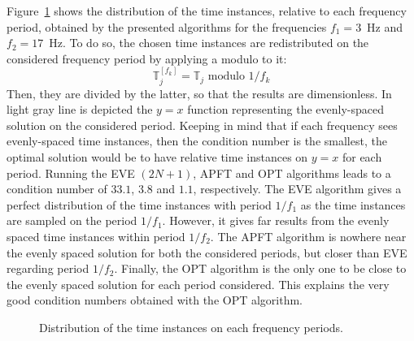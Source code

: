 Figure~\ref{fig:distribution_tlv} shows the distribution of the time
instances, relative to each frequency period, obtained by the presented
algorithms for the frequencies $f_1 = 3$~Hz and $f_2 = 17$~Hz. 
To do so, the chosen time instances are redistributed
on the considered frequency period by applying a modulo to it:
\begin{equation}
  \label{eq:1}
  \mathbb{T}^{[f_k]}_j =  \mathbb{T}_j \text{ modulo } 1/f_k
\end{equation}
Then, they are divided by the latter, so that the results are
dimensionless.  In light gray line is depicted the $y=x$ function
representing the evenly-spaced solution on the considered period.
Keeping in mind that if each frequency sees evenly-spaced time instances,
then the condition number is the smallest, the optimal solution would
be to have relative time instances on $y=x$ for each period.  Running the
EVE $(2N + 1)$, APFT and OPT algorithms leads to a condition number of $33.1$,
$3.8$ and $1.1$, respectively.  The EVE algorithm gives a perfect distribution
of the time instances with
period $1/f_1$ as the time instances are sampled on the period
$1/f_1$. However, it gives far results from the evenly spaced time instances
within period $1/f_2$. The APFT algorithm is nowhere near the evenly spaced
solution for both the considered periods, but closer than EVE regarding
period $1/f_2$. Finally, the OPT algorithm is the only one to be close
to the evenly spaced solution for each period considered. This explains the
very good condition numbers obtained with the OPT algorithm.
\begin{figure}[htp]
  \centering 
  \caption{Distribution of the time instances on each frequency periods.}
  \label{fig:distribution_tlv}
\end{figure}
